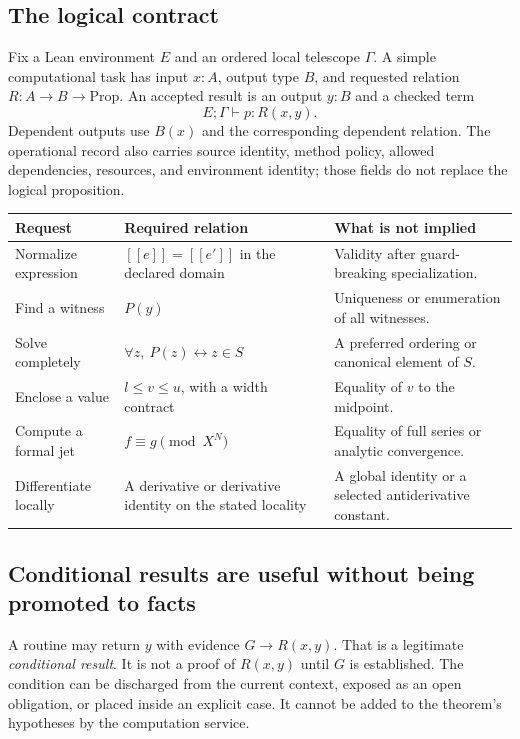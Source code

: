 \documentclass[11pt,letterpaper]{article}
\newcommand{\sem}[1]{[\![#1]\!]}
\theoremstyle{definition}
\begin{document}
\subsection{The logical contract}
Fix a Lean environment \(E\) and an ordered local telescope \(\Gamma\). A simple
computational task has input \(x:A\), output type \(B\), and requested relation
\(R:A\to B\to\mathrm{Prop}\). An accepted result is an output \(y:B\) and a checked
term
\[
 E;\Gamma\vdash p:R(x,y).
\]
Dependent outputs use \(B(x)\) and the corresponding dependent relation. The
operational record also carries source identity, method policy, allowed
dependencies, resources, and environment identity; those fields do not replace
the logical proposition.

\begin{tabularx}{\textwidth}{@{}P{.23\textwidth}YP{.23\textwidth}@{}}
\toprule
Request & Required relation & What is not implied \\
\midrule
Normalize expression & \(\sem{e}=\sem{e'}\) in the declared domain & Validity after
guard-breaking specialization.\\
Find a witness & \(P(y)\) & Uniqueness or enumeration of all witnesses.\\
Solve completely & \(\forall z,\ P(z)\leftrightarrow z\in S\) & A preferred ordering
or canonical element of \(S\).\\
Enclose a value & \(l\le v\le u\), with a width contract & Equality of \(v\) to the
midpoint.\\
Compute a formal jet & \(f\equiv g\pmod{X^N}\) & Equality of full series or analytic
convergence.\\
Differentiate locally & A derivative or derivative identity on the stated locality &
A global identity or a selected antiderivative constant.\\
\bottomrule
\end{tabularx}

\subsection{Conditional results are useful without being promoted to facts}
A routine may return \(y\) with evidence \(G\to R(x,y)\). That is a legitimate
\emph{conditional result}. It is not a proof of \(R(x,y)\) until \(G\) is established.
The condition can be discharged from the current context, exposed as an open
obligation, or placed inside an explicit case. It cannot be added to the theorem's
hypotheses by the computation service.
\end{document}
